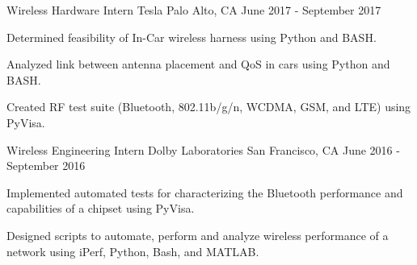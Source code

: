 \begin{cventries}



\cventry
{Wireless Hardware Intern} %
{Tesla} %
{Palo Alto, CA} %
{June 2017 - September 2017} %
{ %
\begin{cvitems}
\item {Determined feasibility of In-Car wireless harness using Python and BASH.}
\item {Analyzed link between antenna placement and QoS in cars using Python and BASH.}
\item {Created RF test suite (Bluetooth, 802.11b/g/n, WCDMA, GSM, and LTE) using PyVisa.}
\end{cvitems}
}


\cventry
{Wireless Engineering Intern} %
{Dolby Laboratories} %
{San Francisco, CA} %
{June 2016 - September 2016} %
{ %
\begin{cvitems}
\item {Implemented automated tests for characterizing the Bluetooth performance and capabilities of a chipset using PyVisa.}
\item {Designed scripts to automate, perform and analyze wireless performance of a network using iPerf, Python, Bash, and MATLAB.}
\end{cvitems}
}



\end{cventries}